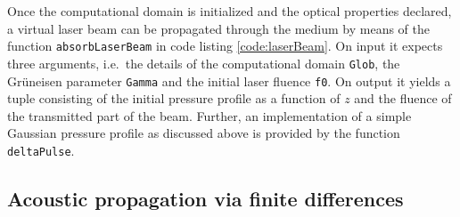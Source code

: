 \documentclass[5p,times,twocolumn]{elsarticle}
\begin{document}
Once the computational domain is initialized and the optical properties
declared, a virtual laser beam can be propagated through the medium by means of
the function {\tt{absorbLaserBeam}} in code listing \ref{code:laserBeam}.
On input it expects three arguments, i.e.\ the details of the computational
domain {\tt{Glob}}, the Gr\"uneisen parameter {\tt{Gamma}} and the initial
laser fluence {\tt{f0}}. On output it yields a tuple consisting of the initial
pressure profile as a function of $z$ and the fluence of the transmitted part
of the beam. Further, an implementation of a simple Gaussian pressure profile 
as discussed above is provided by the function {\tt{deltaPulse}}.

\subsection{Acoustic propagation via finite differences}
\label{ssect:acoustic}
\end{document}
